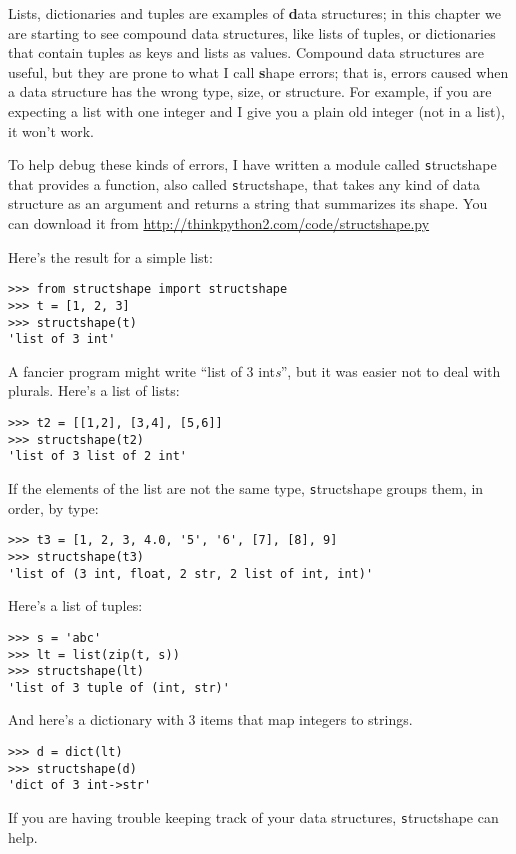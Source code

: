 \documentclass[
DIV=11,
fontsize=12,
twoside,
headinclude=false,
titlepage=firstiscover,
abstract=true,
headsepline=true,
footsepline=true,
chapterprefix=true, %
headings=big,
bibliography=totoc,%
captions=tableheading
]{scrbook}
\theoremstyle{definition}
\begin{document}
Lists, dictionaries and tuples are examples of {\textbf data
  structures}; in this chapter we are starting to see compound data
structures, like lists of tuples, or dictionaries that contain tuples
as keys and lists as values.  Compound data structures are useful, but
they are prone to what I call {\textbf shape errors}; that is, errors
caused when a data structure has the wrong type, size, or structure.
For example, if you are expecting a list with one integer and I
give you a plain old integer (not in a list), it won't work.

To help debug these kinds of errors, I have written a module
called {\texttt structshape} that provides a function, also called
{\texttt structshape}, that takes any kind of data structure as
an argument and returns a string that summarizes its shape.
You can download it from \url{http://thinkpython2.com/code/structshape.py}

Here's the result for a simple list:

\begin{lstlisting}
>>> from structshape import structshape
>>> t = [1, 2, 3]
>>> structshape(t)
'list of 3 int'
\end{lstlisting}
%
A fancier program might write ``list of 3 int{\em s}'', but it
was easier not to deal with plurals.  Here's a list of lists:

\begin{lstlisting}
>>> t2 = [[1,2], [3,4], [5,6]]
>>> structshape(t2)
'list of 3 list of 2 int'
\end{lstlisting}
%
If the elements of the list are not the same type,
{\texttt structshape} groups them, in order, by type:

\begin{lstlisting}
>>> t3 = [1, 2, 3, 4.0, '5', '6', [7], [8], 9]
>>> structshape(t3)
'list of (3 int, float, 2 str, 2 list of int, int)'
\end{lstlisting}
%
Here's a list of tuples:

\begin{lstlisting}
>>> s = 'abc'
>>> lt = list(zip(t, s))
>>> structshape(lt)
'list of 3 tuple of (int, str)'
\end{lstlisting}
%
And here's a dictionary with 3 items that map integers to strings.

\begin{lstlisting}
>>> d = dict(lt) 
>>> structshape(d)
'dict of 3 int->str'
\end{lstlisting}
%
If you are having trouble keeping track of your data structures,
{\texttt structshape} can help.
\end{document}
